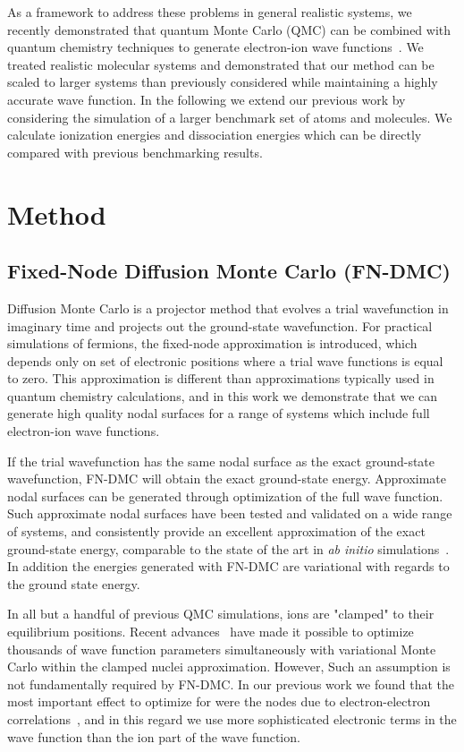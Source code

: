 \documentclass[pra,superscriptaddress,groupedaddress,twocolumn]{revtex4}
\begin{document}
As a framework to address these problems in general realistic systems, we recently demonstrated that quantum Monte Carlo (QMC) can be combined with quantum chemistry techniques to generate electron-ion wave functions~\cite{Tubman_ECG}.  We treated realistic molecular systems and demonstrated that our method can be scaled to larger systems than previously considered while maintaining a highly accurate wave function. In the following we extend our previous work by considering the simulation of a larger benchmark set of atoms and molecules.  We calculate ionization energies and dissociation energies which can be directly compared with previous benchmarking results.

\section{Method}
\subsection{Fixed-Node Diffusion Monte Carlo (FN-DMC)}
Diffusion Monte Carlo is a projector method that evolves a trial wavefunction in imaginary time and projects out the ground-state wavefunction.  For practical simulations of fermions, the fixed-node approximation is introduced, which depends only on set of electronic positions where a trial wave functions is equal to zero.  This approximation is different than approximations typically used in quantum chemistry calculations, and in this work we demonstrate that we can generate high quality nodal surfaces for a range of systems which include full electron-ion wave functions. 

If the trial wavefunction has the same nodal surface as the exact ground-state wavefunction, FN-DMC will obtain the exact ground-state energy.  Approximate nodal surfaces can be generated through optimization of the full wave function. Such approximate nodal surfaces have been tested and validated on a wide range of systems, and consistently provide an excellent approximation of the exact ground-state energy,  comparable to the state of the art in \textit{ab initio} simulations~\cite{grossman1}. In addition the energies generated with FN-DMC are variational with regards to the ground state energy.

In all but a handful of previous QMC simulations, ions are "clamped" to their equilibrium positions. Recent advances~\cite{Nightingale_Linear,Umrigar_Linear,Brown_Bench} have made it possible to optimize thousands of wave function parameters simultaneously with variational Monte Carlo within the clamped nuclei approximation. However, Such an assumption is not fundamentally required by FN-DMC.  In our previous work we found that the most important effect to optimize for were the nodes due to electron-electron correlations~\cite{Tubman_ECG}, and in this regard we use more sophisticated electronic terms in the wave function than the ion part of the wave function.
\end{document}

